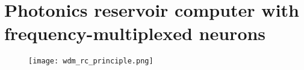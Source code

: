 \section[Photonics RC with frequency-multiplexed neurons]{Photonics reservoir computer with frequency-multiplexed neurons}

\begin{frame}
	\begin{figure}
		\texttt{[image: wdm\_rc\_principle.png]}
		\caption{\cite{AkroutAkram2016Pprc}}
	\end{figure}
\end{frame}

